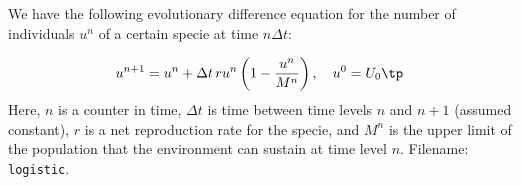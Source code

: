\documentclass[graybox,sectrefs,envcountresetchap,open=right,final]{svmonodo}
\makeatletter
\newenvironment{doconceexercise}{}{}
\newcounter{doconceexercisecounter}%
\newcommand\listofexercises{
\chapter*{List of Exercises, Problems, and Projects
          \@mkboth{List of Exercises, Problems, and Projects}{List of Exercises, Problems, and Projects}}
\markboth{List of Exercises, Problems, and Projects}{List of Exercises, Problems, and Projects}
\@starttoc{loe}
}
\def\cleardoublepage{\clearpage\if@twoside \ifodd\c@page\else
\hbox{}
\thispagestyle{empty}
\newpage
\if@twocolumn\hbox{}\newpage\fi\fi\fi}
\makeatother
\begin{document}
\begin{doconceexercise}

                
\label{softeng1:exer:logistic}

We have the following evolutionary difference equation for the number
of individuals $u^n$ of a certain specie at time $n\Delta t$:

\begin{equation}
u^{n+1} = u^n + \Delta t\, r u^n\left(1 - \frac{u^n}{M^n}\right),
\quad u^0=U_0\tp
\label{softeng1:exer:logistic:eq}
\end{equation}
Here, $n$ is a counter in time, $\Delta t$ is time between time levels
$n$ and $n+1$ (assumed constant), $r$ is a net reproduction rate
for the specie,
and $M^n$ is the upper limit of the population that the environment can
sustain at time level $n$.
\noindent Filename: \texttt{logistic}.

\end{doconceexercise}


\clearemptydoublepage
{}
\thispagestyle{empty}





\cleardoublepage{}  %
\printindex
\end{document}
